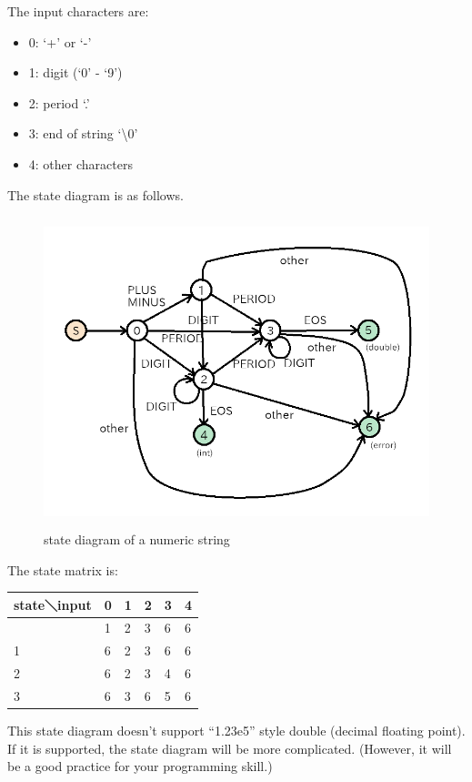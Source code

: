 The input characters are:

\begin{itemize}
\tightlist
\item
  0: `+' or `-'
\item
  1: digit (`0' - `9')
\item
  2: period `.'
\item
  3: end of string `\textbackslash0'
\item
  4: other characters
\end{itemize}

The state diagram is as follows.

\begin{figure}
\centering
\includegraphics[width=12cm,height=9cm]{../image/state_diagram.png}
\caption{state diagram of a numeric string}
\end{figure}

The state matrix is:

\begin{longtable}[]{@{}llllll@{}}
\toprule\noalign{}
state＼input & 0 & 1 & 2 & 3 & 4 \\
\midrule\noalign{}
\endhead
\bottomrule\noalign{}
\endlastfoot
0 & 1 & 2 & 3 & 6 & 6 \\
1 & 6 & 2 & 3 & 6 & 6 \\
2 & 6 & 2 & 3 & 4 & 6 \\
3 & 6 & 3 & 6 & 5 & 6 \\
\end{longtable}

This state diagram doesn't support ``1.23e5'' style double (decimal
floating point). If it is supported, the state diagram will be more
complicated. (However, it will be a good practice for your programming
skill.)


